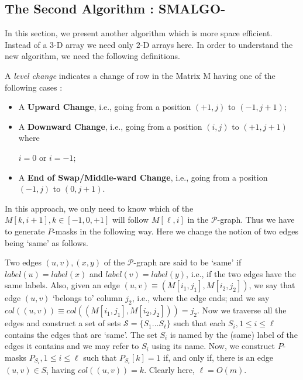\documentclass{llncs}
\newcommand{\rom}[1]{\uppercase\expandafter{\romannumeral #1\relax}}
\begin{document}
{\subsection{\label{NewAlgo}The Second Algorithm : SMALGO-\rom{2}} 

In this section, we present another algorithm which is more space efficient. Instead of a $3$-D array we need only $2$-D arrays here. In order to understand the new algorithm, we need the following definitions.

\begin{definition}\label{levelchange}
A \emph{level change} indicates a change of row in the Matrix M having one of the following cases :
\begin{itemize}
\item A \textbf{Upward Change}, i.e., going from a position $(+1,j)$ to $(-1,j+1)$; 

\item A \textbf{Downward Change}, i.e., going from a position $(i,j)$ to $(+1,j+1)$ where 

$i = 0$ or $i = -1$; 

\item A \textbf{End of Swap/Middle-ward Change}, i.e., going from a position $(-1,j)$ to $(0,j+1)$. 
\end{itemize}

\end{definition}
In this approach, we only need to know which
of the $M[k,i+1], k\in[-1,0,+1]$ will follow $M[\ell,i]$ in the $\mathcal P$-graph. Thus we have to generate $P$-masks in the following way. Here we change the notion of two edges being `same' as follows.


Two edges $(u,v),(x,y)$ of the $\mathcal
P$-graph are said to be `same' if $label(u) =label(x)$ and
$label(v) =label(y)$, i.e., if the two edges have the same labels.
Also, given an edge $(u,v) \equiv (M[i_1,j_1],M[i_2,j_2])$, we say
that edge $(u,v)$ `belongs to' column $j_2$, i.e., where the edge
ends; and we say $col((u,v)) \equiv col((M[i_1,j_1],M[i_2,j_2])) =j_2$. 
Now we traverse all the edges and construct a set of sets
$\mathcal S = \{S_1\ldots S_\ell\}$ such that each $S_i, 1\leq i\leq
\ell$ contains the edges that are `same'. The set $S_i$ is named by
the (same) label of the edges it contains and we may refer to $S_i$
using its name. Now, we construct $P$-masks $P_{S_i}, 1\leq
i\leq \ell$ such that $P_{S_i}[k] = 1$ if, and only if, there is an
edge $(u,v)\in S_i$ having $col((u,v)) = k$. Clearly here, $\ell =
O(m)$.


}
\end{document}
